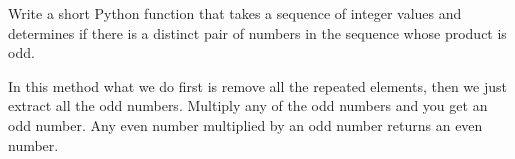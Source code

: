  \label{sssec:ex1_14}

Write a short Python function that takes a sequence of integer values and determines if there is a distinct pair of numbers in the sequence whose product is odd.

In this method what we do first is remove all the repeated elements, then we just extract all the odd numbers. Multiply any of the odd numbers and you get an odd number. Any even number multiplied by an odd number returns an even number.




